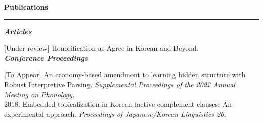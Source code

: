 \documentclass[11pt]{article}
\newcommand{\sect}[1]{{\fontsize{15}{25}\selectfont \textbf{#1}} {\vspace{0.1cm}} \hrule {\vspace{0.3cm}}}
\newcommand{\subsect}[1]{{\fontsize{12}{18}\selectfont \textit{\textbf{#1}}} {\vspace{0.3cm}}}
\begin{document}

{\vspace{1cm}}

{\sect{Publications}}

{\subsect{Articles}}

[Under review] Honorification as Agree in Korean and Beyond.\\

{\subsect{Conference Proceedings}}

{[To Appear] An economy-based amendment to learning hidden structure with Robust Interpretive Parsing. \textit{Supplemental Proceedings of the 2022 Annual Meeting on Phonology.}}\\

{2018. Embedded topicalization in Korean factive complement clauses: An experimental approach. \textit{Proceedings of Japanese/Korean Linguistics 26.}}\\
\end{document}

